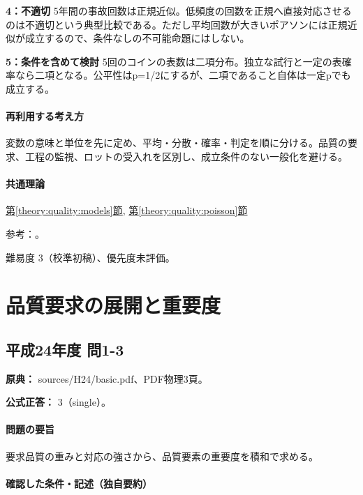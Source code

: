 \noindent\textbf{4：不適切} 5年間の事故回数は正規近似。低頻度の回数を正規へ直接対応させるのは不適切という典型比較である。ただし平均回数が大きいポアソンには正規近似が成立するので、条件なしの不可能命題にはしない。\par

\noindent\textbf{5：条件を含めて検討} 5回のコインの表数は二項分布。独立な試行と一定の表確率なら二項となる。公平性はp=\allowbreak{}1/2にするが、二項であること自体は一定pでも成立する。\par

\paragraph{再利用する考え方} 変数の意味と単位を先に定め、平均・分散・確率・判定を順に分ける。品質の要求、工程の監視、ロットの受入れを区別し、成立条件のない一般化を避ける。

\paragraph{共通理論} \hyperref[theory:quality:models]{第\ref*{theory:quality:models}節}, \hyperref[theory:quality:poisson]{第\ref*{theory:quality:poisson}節}

\par 参考：\cite{stat_nist_binomial,stat_nist_poisson,stat_nist_exponential,stat_nist_normal}。

\par 難易度 3（校準初稿）、優先度未評価。

\section{品質要求の展開と重要度}

\subsection{平成24年度 問1-3}
\label{q:h24-reg-basic-1-3}

\noindent\textbf{原典：} sources/H24/basic.pdf、PDF物理3頁。

\textbf{公式正答：} 3（single）。

\paragraph{問題の要旨} 要求品質の重みと対応の強さから、品質要素の重要度を積和で求める。

\paragraph{確認した条件・記述（独自要約）}\mbox{}\par

